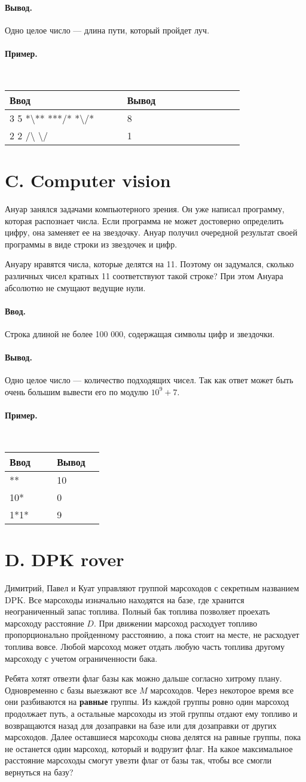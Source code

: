 \documentclass[10pt, a5paper]{article}
\newcommand{\informat}[1]
{
	\paragraph{Ввод.\\} #1
}
\newcommand{\outformat}[1]
{
	\paragraph{Вывод.\\} #1
}
\newcommand{\examplee}[4]
{
	\paragraph{Пример.\\}
	{\tt
	\begin{tabular}{|p{0.4\linewidth}|p{0.4\linewidth}|}
	\hline
	Ввод 	& Вывод  	\\
	\hline
	#1 		& #2 		\\
	\hline
	#3		& #4		\\
	\hline
	\end{tabular}
	}
}
\newcommand{\exampleee}[6]
{
	\paragraph{Пример.\\}
	{\tt
	\begin{tabular}{|p{0.4\linewidth}|p{0.4\linewidth}|}
	\hline
	Ввод 	& Вывод  	\\
	\hline
	#1 		& #2 		\\
	\hline
	#3		& #4		\\
	\hline
	#5		& #6		\\
	\hline
	\end{tabular}
	}
}
\begin{document}
\outformat{Одно целое число --- длина пути, который пройдет луч.}

\examplee
{
3 5 \newline
*\textbackslash***\newline
***/*\newline
*\textbackslash*/*
}
{8}
{
2 2 \newline
/\textbackslash \newline
\textbackslash/}
{1}




\section*{C. Computer vision}
 

Ануар занялся задачами компьютерного зрения. Он уже написал программу, которая распознает числа. Если программа не может достоверно определить цифру, она заменяет ее на звездочку. Ануар получил очередной результат своей программы в виде строки из звездочек и цифр. 

Ануару нравятся числа, которые делятся на 11. Поэтому он задумался, сколько различных чисел кратных 11 соответствуют такой строке? При этом Ануара абсолютно не смущают ведущие нули.

\informat{Строка длиной не более 100 000, содержащая символы цифр и звездочки.}

\outformat{Одно целое число --- количество подходящих чисел. Так как ответ может быть очень большим вывести его по модулю $10^9+7$.}

\exampleee{**}{10}{10*}{0}{1*1*}{9}




\section*{D. DPK rover}
 

Димитрий, Павел и Куат управляют группой марсоходов с секретным названием DPK. Все марсоходы изначально находятся на базе, где хранится неограниченный запас топлива. Полный бак топлива позволяет проехать марсоходу расстояние $D$. При движении марсоход расходует топливо пропорционально пройденному расстоянию, а пока стоит на месте, не расходует топлива вовсе. Любой марсоход может отдать любую часть топлива другому марсоходу с учетом ограниченности бака.

Ребята хотят отвезти флаг базы как можно дальше согласно хитрому плану. Одновременно с базы выезжают все $M$ марсоходов. Через некоторое время все они разбиваются на \textbf{равные} группы. Из каждой группы ровно один марсоход продолжает путь, а остальные марсоходы из этой группы отдают ему топливо и возвращаются назад для дозаправки на базе или для дозаправки от других марсоходов. Далее оставшиеся марсоходы снова делятся на равные группы, пока не останется один марсоход, который и водрузит флаг. На какое максимальное расстояние марсоходы смогут увезти флаг от базы так, чтобы все смогли вернуться на базу?
\end{document}
